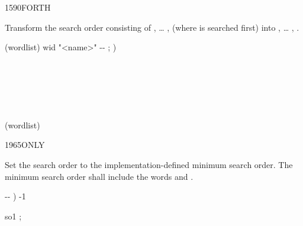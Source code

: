 \enlargethispage{8ex}\vspace*{-2ex}
\begin{worddef}{1590}{FORTH}
\item \stack{}{}

	Transform the search order consisting of , {\ldots}
	,  (where  is searched
	first) into , {\ldots} ,
	.

	\begin{implement} %
		\word{:} (wordlist)  wid "<name>" -{}- ; ) \\
		\tab {} \word{,} \\
		\tab {} \\
		\tab[2]    \\
		\tab[2]   \\
		\tab[2]    \\
		\word{;}
	
		 (wordlist) 
	\end{implement}
\end{worddef}

\vspace*{-2ex}
\begin{worddef}{1965}{ONLY}
\item \stack{}{}

	Set the search order to the implementation-defined minimum search
	order. The minimum search order shall include the words
	 and .

	\begin{implement} %
		\word{:}   -{}- ) -1  \word{;}
	\end{implement}

	\begin{testing} %
		\ttfamily

		\word{:} so1  {;}  

		 \\
	\end{testing}
\end{worddef}

